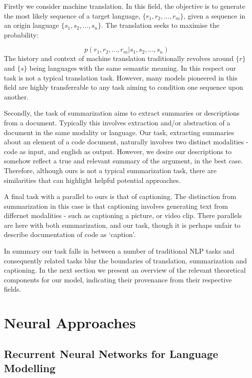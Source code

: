 Firstly we consider machine translation. In this field, the objective is to generate the most likely sequence of a target language, $\{r_1, r_2,..., r_m\}$, given a sequence in an origin language  $\{s_1, s_2,..., s_n\}$. 
The translation seeks to maximise the probability:

$$ p(r_1, r_2,..., r_m| s_1, s_2,...,s_n )$$
The history and context of machine translation traditionally revolves around $\{r\}$ and $\{s\}$ being languages with the same semantic meaning. 
In this respect our task is not a typical translation task.
However, many models pioneered in this field are highly transferrable to any task aiming to condition one sequence upon another.

Secondly, the task of summarization aims to extract summaries or descriptions from a document.
Typically this involves extraction and/or abstraction of a document in the same modality or language.
Our task, extracting summaries about an element of a code document, naturally involves two distinct modalities - code as input, and english as output.
However, we desire our descriptions to somehow reflect a true and relevant summary of the argument, in the best case.
Therefore, although ours is not a typical summarization task, there are similarities that can highlight helpful potential approaches.

A final task with a parallel to ours is that of captioning. 
The distinction from summarization in this case is that captioning involves generating text from differnet modalities - such as captioning a picture, or video clip.
There parallels are here with both summarization, and our task, though it is perhaps unfair to describe documentation of code as `caption'.

In summary our task falls in between a number of traditional NLP tasks and consequently related tasks blur the boundaries of translation, summarization and captioning. In the next section we present an overview of the relevant theoretical components for our model, indicating their provenance from their respective fields.

\section{Neural Approaches}

\subsection{Recurrent Neural Networks for Language Modelling} %
\label{sub:recurrent_neural_networks}

